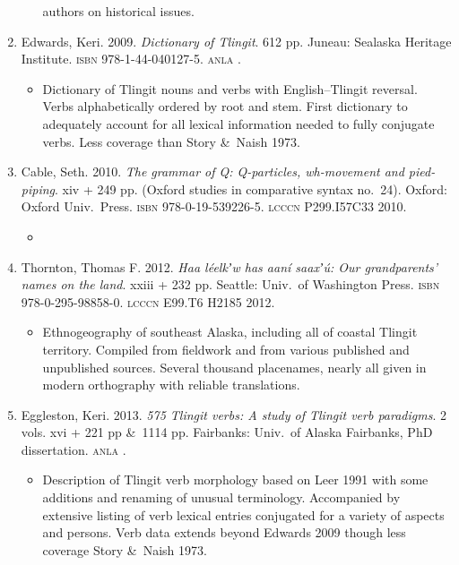 \documentclass[12pt,letterpaper,oneside,article]{memoir}
\begin{document}
\begin{enumerate}
\begin{itemize}
		authors on historical issues.
	\end{itemize}
\item	Edwards, Keri.
	2009.
	\textit{Dictionary of Tlingit}.
	612 pp.
	Juneau: Sealaska Heritage Institute.
	\textsc{isbn} 978-1-44-040127-5.
	\textsc{anla} .
	\begin{itemize}
	\item	Dictionary of Tlingit nouns and verbs with English–Tlingit reversal.
		Verbs alphabetically ordered by root and stem.
		First dictionary to adequately account for all lexical information needed
		to fully conjugate verbs.
		Less coverage than Story \&\ Naish 1973.
	\end{itemize}
\item	Cable, Seth.
	2010.
	\textit{The grammar of Q: Q-particles, wh-movement and pied-piping}.
	xiv + 249 pp.
	(Oxford studies in comparative syntax no.\ 24).
	Oxford: Oxford Univ.\ Press.
	\textsc{isbn} 978-0-19-539226-5.
	\textsc{lcccn} P299.I57C33 2010.
	\begin{itemize}
	\item	{}
	\end{itemize}
\item	Thornton, Thomas F.
	2012.
	\textit{Haa léelkʼw has aaní saaxʼú: Our grandparents’ names on the land}.
	xxiii + 232 pp.
	Seattle: Univ.\ of Washington Press.
	\textsc{isbn} 978-0-295-98858-0.
	\textsc{lcccn} E99.T6 H2185 2012.
	\begin{itemize}
	\item	Ethnogeography of southeast Alaska, including all of coastal Tlingit territory.
		Compiled from fieldwork and from various published and unpublished sources.
		Several thousand placenames, nearly all given in modern orthography with
		reliable translations.
	\end{itemize}
\item	Eggleston, Keri.
	2013.
	\textit{575 Tlingit verbs: A study of Tlingit verb paradigms}.
	2 vols. 
	xvi + 221 pp \&\ 1114 pp.
	Fairbanks: Univ.\ of Alaska Fairbanks, PhD dissertation.
	\textsc{anla} .
	\begin{itemize}
	\item	Description of Tlingit verb morphology based on Leer 1991 with some
		additions and renaming of unusual terminology.
		Accompanied by extensive listing of verb lexical entries conjugated for
		a variety of aspects and persons.
		Verb data extends beyond Edwards 2009 though less coverage 
		Story \&\ Naish 1973.

\end{itemize}
\end{enumerate}
\end{document}
